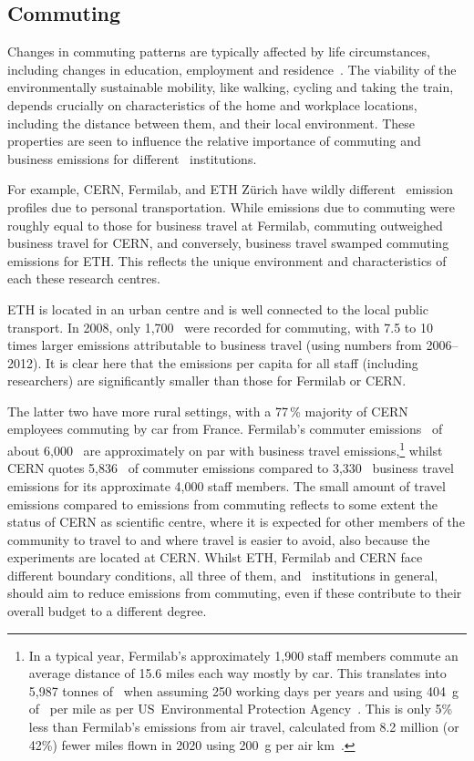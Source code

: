 \documentclass[../SustainableHEP.tex]{subfiles}
\begin{document}
\subsection{Commuting}

Changes in commuting patterns are typically affected by life circumstances, including changes in education, employment and residence~\cite{BEIGE2017179}.  The viability of the environmentally sustainable mobility, like walking, cycling and taking the train, depends crucially on characteristics of the home and workplace locations, including the distance between them, and their local environment. These properties are seen to influence the relative importance of commuting and business emissions for different \ACR\ institutions. 

For example, CERN, Fermilab, and ETH Z\"urich have wildly different \CdO\ emission profiles due to personal transportation. While emissions due to commuting were roughly equal to those for business travel at Fermilab, commuting outweighed business travel for CERN, and conversely, business travel swamped commuting emissions for ETH. This reflects the unique environment and characteristics of each these research centres. 

ETH is located in an urban centre and is well connected to the local public transport. In 2008, only 1,700 \tCdOe\ were recorded for commuting, with 7.5 to 10 times larger emissions attributable to business travel (using numbers from 2006--2012). 
It is clear here that the emissions per capita for all staff (including researchers) are significantly smaller than those for Fermilab or CERN. 

The latter two have more rural settings, with a 77\,\% majority of CERN employees commuting by car from France. Fermilab's commuter emissions~\cite{FermilabEnvReport} of about 6,000 \tCdOe\ are approximately on par with business travel emissions,\footnote{In a typical year, Fermilab’s approximately 1,900 staff members commute an average distance of 15.6 miles each way mostly by car. This translates into 5,987 tonnes of \CdO\ when assuming 250 working days per years and using 404~g of \CdO\ per mile as per US~Environmental Protection Agency~\cite{USEPA}. This is only 5\;\% less than Fermilab's emissions from air travel, calculated from 8.2 million (or 42\;\%) fewer miles flown in 2020 using 200~g per air km~\cite{RefAGU}.} whilst CERN quotes 5,836 \tCdOe\ of commuter emissions compared to 3,330 \tCdOe\ business travel emissions for its approximate 4,000 staff members. The small amount of travel emissions compared to emissions from commuting reflects to some extent the status of CERN as scientific centre, where it is expected for other members of the community to travel to and where travel is easier to avoid, also because the experiments are located at CERN. Whilst ETH, Fermilab and CERN face different boundary conditions, all three of them, and \ACR\ institutions in general, should aim to reduce emissions from commuting, even if these contribute to their overall budget to a different degree.
\end{document}
